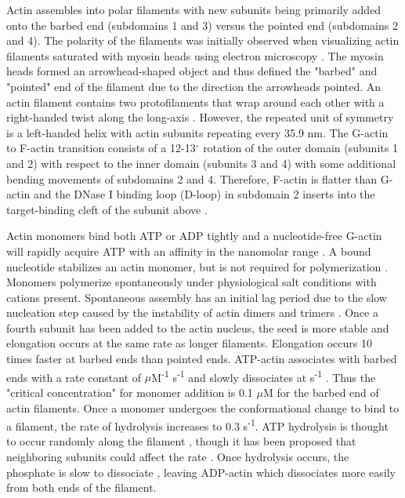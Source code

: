 Actin assembles into polar filaments with new subunits being primarily added onto the barbed end (subdomains 1 and 3) versus the pointed end (subdomains 2 and 4). The polarity of the filaments was initially observed when visualizing actin filaments saturated with myosin heads using electron microscopy \citep{huxley_electron_1963}. The myosin heads formed an arrowhead-shaped object and thus defined the "barbed" and "pointed" end of the filament due to the direction the arrowheads pointed. An actin filament contains two protofilaments that wrap around each other with a right-handed twist along the long-axis \citep{hanson_structure_1963}. However, the repeated unit of symmetry is a left-handed helix with  actin subunits repeating every 35.9 nm. The G-actin to F-actin transition consists of a 12-13$^\circ$ rotation of the outer domain (subunits 1 and 2) with respect to the inner domain (subunits 3 and 4) with some additional bending movements of subdomains 2 and 4. Therefore, F-actin is flatter than G-actin and the DNase I binding loop (D-loop) in subdomain 2 inserts into the target-binding cleft of the subunit above \citep{dominguez_actin_2011}.

Actin monomers bind both ATP or ADP tightly and a nucleotide-free G-actin will rapidly acquire ATP with an affinity in the nanomolar range \citep{de_la_cruz_nucleotide-free_1995}. A bound nucleotide stabilizes an actin monomer, but is not required for polymerization \citep{pollard_actin_2016}. Monomers polymerize spontaneously under physiological salt conditions with cations present. Spontaneous assembly has an initial lag period due to the slow nucleation step caused by the instability of actin dimers and trimers \citep{cooper_kinetic_1983, frieden_polymerization_1983, sept_thermodynamics_2001}. Once a fourth subunit has been added to the actin nucleus, the seed is more stable and elongation occurs at the same rate as longer filaments. Elongation occurs 10 times faster at barbed ends than pointed ends. ATP-actin associates with barbed ends with a rate constant of  $\mu$M\textsuperscript{-1} s\textsuperscript{-1} and slowly dissociates at  s\textsuperscript{-1} \citep{pollard_rate_1986}. Thus the "critical concentration" for monomer addition is 0.1 $\mu$M for the barbed end of actin filaments. Once a monomer undergoes the conformational change to bind to a filament, the rate of hydrolysis increases to 0.3 s\textsuperscript{-1}. ATP hydrolysis is thought to occur randomly along the filament \citep{jeno_internal_1995}, though it has been proposed that neighboring subunits could affect the rate \citep{korn_actin_1987}. Once hydrolysis occurs, the phosphate is slow to dissociate \citep{carlier_direct_1986}, leaving ADP-actin which dissociates more easily from both ends of the filament. 

